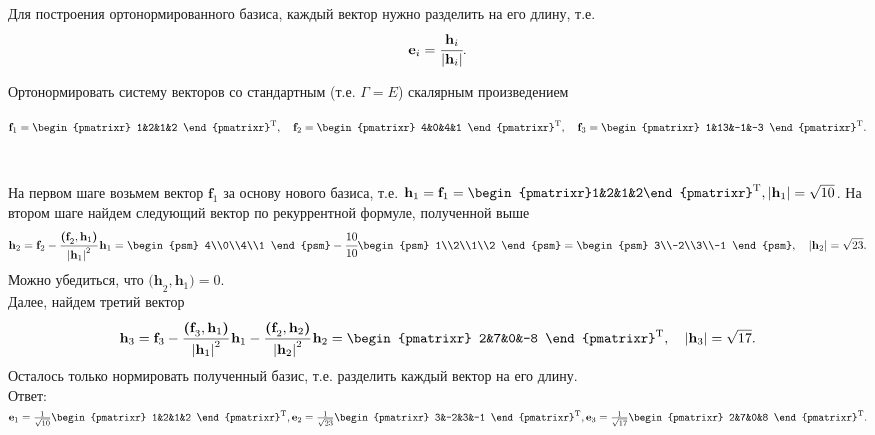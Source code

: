 Для построения ортонормированного базиса, каждый вектор нужно разделить на его длину, т.е.
$$
\textbf{e}_i=\cfrac{\textbf{h}_i}{\left|\textbf{h}_i\right|}.
$$
\begin{prim}
Ортонормировать систему векторов со стандартным (т.е. $\Gamma = E$) скалярным произведением
\begin{center}
		$
		\textbf{f}_1 = \begin{pmatrixr}
			1&2&1&2
		\end{pmatrixr}^{\text{T}}, \quad \textbf{f}_2 = \begin{pmatrixr}
		4&0&4&1
		\end{pmatrixr}^{\text{T}}, \quad \textbf{f$_3$} = \begin{pmatrixr}
		1&13&-1&-3
		\end{pmatrixr}^{\text{T}}.
		$
\end{center}
~\
\end{prim}
На первом шаге возьмем вектор $\textbf{f}_1$ за основу нового базиса, т.е. $\textbf{h}_1 = \textbf{f}_1 =\begin{pmatrixr}1&2&1&2\end{pmatrixr}^{\text{T}}, \abs{\textbf{h}_1} = \sqrt{10}$. На втором шаге найдем следующий вектор по рекуррентной формуле, полученной выше
$$
\textbf{h}_2 = \textbf{f}_2 - \cfrac{\textbf{(f}_2, \textbf{h}_1\textbf{)}}{\abs{\textbf{h}_1}^2}\, \textbf{h}_1=\begin{psm}
4\\0\\4\\1
\end{psm} - \cfrac{10}{10} \begin{psm}
1\\2\\1\\2
\end{psm}=\begin{psm}
3\\-2\\3\\-1
\end{psm}, \quad \abs{\textbf{h}_2} = \sqrt{23}.
$$
Можно убедиться, что $\textbf{(h}_2, \textbf{h}_1\textbf{)} = 0$.\\
Далее, найдем третий вектор
$$
\textbf{h}_3=\textbf{f}_3-\cfrac{\textbf{(f}_3, \textbf{h}_1\textbf{)}}{\abs{\textbf{h}_1}^2}\, \textbf{h}_1-\cfrac{\textbf{(f}_2, \textbf{h}_2\textbf{)}}{\abs{\textbf{h}_2}^2}\, \textbf{h}_2=\begin{pmatrixr}
2&7&0&-8
\end{pmatrixr}^\text{T}, \quad \abs{\textbf{h}_3} = \sqrt{17}.
$$
Осталось только нормировать полученный базис, т.е. разделить каждый вектор на его длину.\\
Ответ:
$\textbf{e}_1=\frac{1}{\sqrt{10}}\begin{pmatrixr}
	1&2&1&2
\end{pmatrixr}^\text{T},
\textbf{e}_2=\frac{1}{\sqrt{23}}\begin{pmatrixr}
3&-2&3&-1
\end{pmatrixr}^\text{T},
\textbf{e}_3=\frac{1}{\sqrt{17}}\begin{pmatrixr}
2&7&0&8
\end{pmatrixr}^\text{T}.
$

